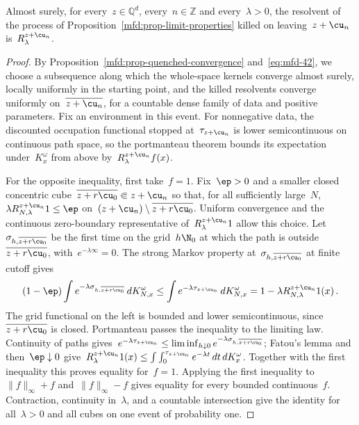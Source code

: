 \documentclass[11pt]{amsart}
\begin{document}
\begin{lemma}
\label{mfd:lem-killing}
Almost surely, for every~$z\in\mathbb Q^d$, every~$n\in\mathbb Z$ and every~$\lambda>0$, the resolvent of the process of Proposition~\ref{mfd:prop-limit-properties} killed on leaving~$z+\cu_n$ is~$R^{z+\cu_n}_\lambda$.
\end{lemma}
\begin{proof}
By Proposition~\ref{mfd:prop-quenched-convergence} and~\eqref{eq:mfd-42}, we choose a subsequence along which the whole-space kernels converge almost surely, locally uniformly in the starting point, and the killed resolvents converge uniformly on~$\overline{z+\cu_n}$, for a countable dense family of data and positive parameters. Fix an environment in this event. For nonnegative data, the discounted occupation functional stopped at~$\tau_{z+\cu_n}$ is lower semicontinuous on continuous path space, so the portmanteau theorem bounds its expectation under~$K^\omega_x$ from above by~$R^{z+\cu_n}_\lambda f(x)$.

\smallskip

For the opposite inequality, first take~$f=1$. Fix~$\ep>0$ and a smaller closed concentric cube~$\overline{z+r\cu_0}\Subset z+\cu_n$ so that, for all sufficiently large~$N$,~$\lambda R^{z+\cu_n}_{N,\lambda}1\leq\ep$ on~$(z+\cu_n)\setminus\overline{z+r\cu_0}$. Uniform convergence and the continuous zero-boundary representative of~$R^{z+\cu_n}_\lambda1$ allow this choice. Let~$\sigma_{h,\overline{z+r\cu_0}}$ be the first time on the grid~$h\N_0$ at which the path is outside~$\overline{z+r\cu_0}$, with~$e^{-\lambda\infty}=0$. The strong Markov property at~$\sigma_{h,\overline{z+r\cu_0}}$ at finite cutoff gives
\begin{equation*}
	(1-\ep)\int e^{-\lambda\sigma_{h,\overline{z+r\cu_0}}}\,dK^\omega_{N,x}
	\leq\int e^{-\lambda\tau_{z+\cu_n}}\,dK^\omega_{N,x}
	=1-\lambda R^{z+\cu_n}_{N,\lambda}1(x)\,.
\end{equation*}
The grid functional on the left is bounded and lower semicontinuous, since~$\overline{z+r\cu_0}$ is closed. Portmanteau passes the inequality to the limiting law. Continuity of paths gives~$e^{-\lambda\tau_{z+\cu_n}}\leq\liminf_{h\downarrow0}e^{-\lambda\sigma_{h,\overline{z+r\cu_0}}}$; Fatou's lemma and then~$\ep\downarrow0$ give~$R^{z+\cu_n}_\lambda1(x)\leq\int\int_0^{\tau_{z+\cu_n}}e^{-\lambda t}\,dt\,dK^\omega_x$. Together with the first inequality this proves equality for~$f=1$. Applying the first inequality to~$\|f\|_\infty+f$ and~$\|f\|_\infty-f$ gives equality for every bounded continuous~$f$. Contraction, continuity in~$\lambda$, and a countable intersection give the identity for all~$\lambda>0$ and all cubes on one event of probability one.


\end{proof}
\end{document}
